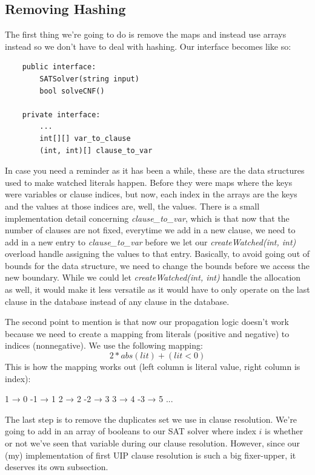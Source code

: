 \documentclass[../main.tex]{subfiles}
\begin{document}
\subsection{Removing Hashing}

The first thing we're going to do is remove the maps and instead use arrays 
instead so we don't have to deal with hashing. Our interface becomes like so:

\begin{lstlisting}
    public interface:
        SATSolver(string input)
        bool solveCNF()

    private interface:
        ...
        int[][] var_to_clause
        (int, int)[] clause_to_var
\end{lstlisting}

In case you need a reminder as it has been a while, these are the data structures 
used to make watched literals happen. Before they were maps where the keys were variables 
or clause indices, but now, each index in the arrays are the keys and the values at those 
indices are, well, the values. There is a small implementation detail concerning 
\textit{clause\_to\_var}, which is that now that the number of clauses are not fixed, 
everytime we add in a new clause, we need to add in a new entry to \textit{clause\_to\_var}
before we let our \textit{createWatched(int, int)} overload handle assigning the values 
to that entry. Basically, to avoid going out of bounds for the data structure, we need to 
change the bounds before we access the new boundary. While we could let 
\textit{createWatched(int, int)} handle the allocation as well, it would make it less 
versatile as it would have to only operate on the last clause in the database instead of 
any clause in the database.

The second point to mention is that now our propagation logic doesn't work because we 
need to create a mapping from literals (positive and negative) to indices (nonnegative).
We use the following mapping:
$$ 2 * abs(lit) + (lit < 0) $$
This is how the mapping works out (left column is literal value, right column is index):
\begin{FVerbatim}
 1 → 0
-1 → 1
 2 → 2
-2 → 3
 3 → 4
-3 → 5
  ...
\end{FVerbatim}

The last step is to remove the duplicates set we use in clause resolution.
We're going to add in an array of booleans to our SAT solver where index $i$ 
is whether or not we've seen that variable during our clause resolution.
However, since our (my) implementation of first UIP clause resolution is 
such a big fixer-upper, it deserves its own subsection.
\end{document}
